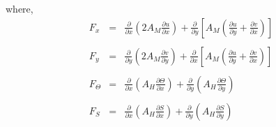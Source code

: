 \documentclass[oribibl]{llncs}
\begin{document}
where,
\begin{eqnarray*}
F_x &=&  \frac{\partial}{\partial x} \left ( 2A_M \frac{\partial u}{\partial x} \right ) + \frac{\partial}{\partial y} \left [ A_M \left ( \frac{\partial u}{\partial y} + \frac{\partial v}{\partial x} \right ) \right ] \\ \nonumber \\ 
F_y &=&  \frac{\partial}{\partial y} \left ( 2A_M \frac{\partial v}{\partial y} \right ) + \frac{\partial}{\partial x} \left [ A_M \left ( \frac{\partial u}{\partial y} + \frac{\partial v}{\partial x} \right ) \right ] \\ \nonumber \\ 
F_\Theta &=&  \frac{\partial}{\partial x} \left ( A_H \frac{\partial \Theta }{\partial x} \right ) + \frac{\partial}{\partial y} \left ( A_H \frac{\partial \Theta }{\partial y} \right ) \\ \nonumber \\ 
F_S &=&  \frac{\partial}{\partial x} \left ( A_H \frac{\partial S}{\partial x} \right ) + \frac{\partial}{\partial y} \left ( A_H \frac{\partial S}{\partial y} \right ) \\ \nonumber \\ 
\end{eqnarray*}



 
\end{document}
